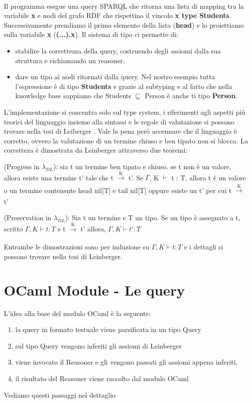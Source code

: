     \\Il programma esegue una query SPARQL che ritorna una lista di mapping tra la variabile \textbf{x} e nodi del grafo RDF che rispettino il vincolo
    \textbf{x type Students}. Successivamente prendiamo il primo elemento della lista (\textbf{head}) e lo proiettiamo sulla variabile \textbf{x} (\textbf{(...).x}).
    Il sistema di tipo ci permette di:
    \begin{itemize}
        \item stabilire la correttezza della query, costruendo degli assiomi dalla sua struttura e richiamando un reasoner.
        \item dare un tipo ai nodi ritornati dalla query. Nel nostro esempio tutta l'espressione è di tipo \textbf{Students} e grazie al subtyping e al fatto
            che nella knowledge base sappiamo che Students $\sqsubseteq$ Person è anche ti tipo \textbf{Person}.
    \end{itemize}
    L'implementazione si concentra solo sul type system, i riferimenti agli aspetti più teorici del linguaggio insieme alla sintassi e le regole di valutazione
    si possono trovare nella tesi di Leiberger \cite{leinbergerphdthesis}.
    Vale la pena per\`o accennare che il linguaggio è corretto, ovvero la valutazione di un termine chiuso e ben tipato non si blocca.
    La corretteza è dimostrata da Leinberger attraverso due teoremi:
    \begin{theorem}
        (Progress in $\lambda_{DL}$): sia t un termine ben tipato e chiuso. se t non è un valore, allora esiste una termine t' tale che
        t $\xrightarrow[]{\text{K}}$ t'. Se $\Gamma$, K $\vdash$ t : T, allora t è un valore o un termine contenente head nil[T] e tail nil[T] oppure esiste
        un t' per cui t $\xrightarrow[]{\text{K}}$ t'
    \end{theorem}
    \begin{theorem}
        (Preservation in $\lambda_{DL}$): Sia t un termine e T un tipo. Se un tipo è assegnato a t, scritto $\Gamma,K \vdash t : T$ e t $\xrightarrow[]{\text{K}}$ t'
        allora, $\Gamma,K \vdash t' : T$
    \end{theorem}
    Entrambe le dimostrazioni sono per induzione su $\Gamma,K \vdash t : T$ e i dettagli si possono trovare nella tesi di Leinberger.

\newpage
\section{OCaml Module - Le query} \label{sec:OCaml Module - Le query}
L'idea alla base del modulo OCaml è la seguente:
\begin{enumerate}
    \item la query in formato testuale viene parsificata in un tipo Query
    \item sul tipo Query vengono inferiti gli assiomi di Leinberger
    \item viene invocato il Reasoner e gli vengono passati gli assiomi appena inferiti.
    \item il risultato del Reasoner viene raccolto dal modulo OCaml
\end{enumerate}
Vediamo questi passaggi nel dettaglio


